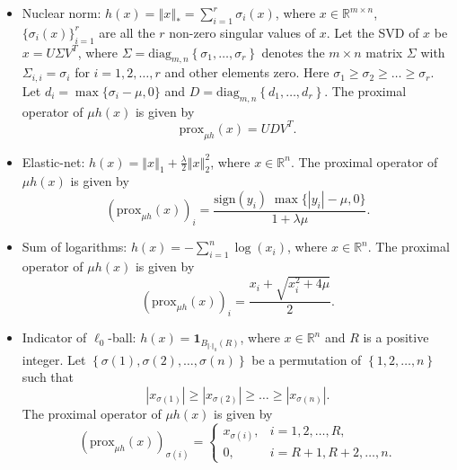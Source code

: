 \documentclass[a4paper]{article}
\newcommand{\norm}[1]{\left\Vert#1\right\Vert}
\newcommand{\mr}{\mathbb{R}}
\newcommand{\prox}{\mathrm{prox}}
\newcommand{\sign}{\mathrm{sign}}
\newcommand{\mi}{\mathbf{1}}
\newcommand{\diag}{\mathrm{diag}}
\begin{document}
\begin{itemize}
    \item {Nuclear norm:} $h(x) = \norm{x}_* = \sum_{i = 1}^{r} 
    \sigma_i(x)$, where $x \in \mr^{m \times n}$, $\{ \sigma_i(x) 
    \}_{i=1}^r$ are all the $r$ non-zero singular values of $x$. Let 
    the SVD of $x$ be $x = U \Sigma V^T$, where $\Sigma = 
    \diag_{m,n}\left\{ \sigma_1, \ldots, \sigma_r \right\}$ denotes 
    the 
    $m \times n$ matrix $\Sigma$ with $\Sigma_{i,i} = \sigma_i$ for 
    $i 
    = 1, 2, \ldots, r$ and other elements zero. Here $\sigma_1 \ge 
    \sigma_2 \ge \ldots \ge \sigma_r$. Let $d_i = \max\{ 
    \sigma_i - \mu, 0 \}$ and $D = \diag_{m,n}\left\{ d_1, \ldots, 
    d_r 
    \right\}$. The proximal operator of $\mu h(x)$ is given by
    \begin{displaymath}
      \prox_{\mu h}(x) = U D V^T.
    \end{displaymath}
    
    \item {Elastic-net:} $h(x) = \norm{x}_1 + \frac{\lambda}{2} 
    \norm{x}_2^2$, where $x \in \mr^n$. The proximal operator of $\mu 
    h(x)$ is given by
    \begin{displaymath}
      (\prox_{\mu h}(x))_i =  \frac{\sign(y_i) \; \max\{ |y_i| - \mu, 
        0 
        \}}{1 + \lambda \mu}.
    \end{displaymath}
    
    \item {Sum of logarithms:} $h(x) = -\sum_{i=1}^{n} \log(x_i)$, 
    where $x \in \mr^n$. The proximal operator of $\mu h(x)$ 
    is given by
    \begin{displaymath}
      (\prox_{\mu h}(x))_i = \frac{x_i + \sqrt{x_i^2 + 4\mu}}{2}.
    \end{displaymath}
    
    \item {Indicator of $\ell_0$-ball:} $h(x) = 
    \mi_{B_{\norm{\cdot}_0}(R)}$, where $x \in \mr^n$ and $R$ is a 
    positive integer. Let $\left\{ \sigma(1), \sigma(2), \ldots, 
    \sigma(n) \right\}$ be a permutation of $\left\{  1, 2, \ldots, n 
    \right\}$ such that 
    \begin{displaymath}
      |x_{\sigma(1)}| \ge |x_{\sigma(2)}| \ge \ldots \ge 
      |x_{\sigma(n)}|.
    \end{displaymath}
    The proximal operator of $\mu h(x)$ is given by
    \begin{displaymath}
      (\prox_{\mu h}(x))_{\sigma(i)} = 
      \begin{cases}
        x_{\sigma(i)}, & i = 1, 2, \ldots, R, \\
        0, & i = R + 1, R + 2, \ldots, 
        n.
      \end{cases}
    \end{displaymath}
    

\end{itemize}
\end{document}
